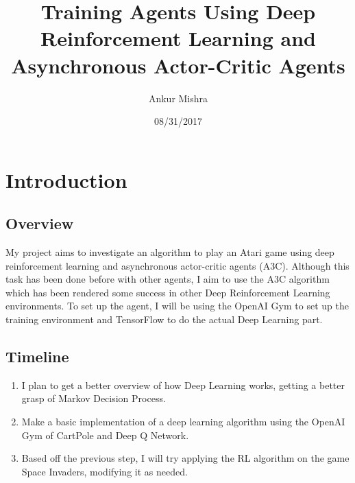 \documentclass[11pt]{article}
\author{Ankur Mishra}
\date{08/31/2017}
\title{Training Agents Using Deep Reinforcement Learning and Asynchronous Actor-Critic Agents}
\begin{document}
\maketitle
\tableofcontents


\section{Introduction}
\label{sec-1}
\subsection{Overview}
\label{sec-1-1}
My project aims to investigate an algorithm to play an Atari game using deep reinforcement learning and asynchronous actor-critic agents (A3C).
Although this task has been done before with other agents, I aim to use the A3C algorithm which has been rendered some success in other Deep Reinforcement Learning environments. To set up the agent, I will be using the OpenAI Gym to set up the training environment and TensorFlow to do the actual Deep Learning part. 
\subsection{Timeline}
\label{sec-1-2}
\begin{enumerate}
\item I plan to get a better overview of how Deep Learning works, getting a better grasp of Markov Decision Process.
\item Make a basic implementation of a deep learning algorithm using the OpenAI Gym of CartPole and Deep Q Network.
\item Based off the previous step, I will try applying the RL algorithm on the game Space Invaders, modifying it as needed.
\end{enumerate}
\end{document}
